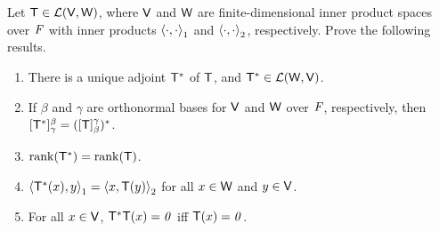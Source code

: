 \begin{ex}\label{ex:6.3.15}
  Let \(\mathsf{T} \in \mathcal{L}(\mathsf{V}, \mathsf{W})\), where \(\mathsf{V}\) and \(\mathsf{W}\) are finite-dimensional inner product spaces over \(\mathit{F}\) with inner products \(\left\langle\cdot, \cdot\right\rangle_1\) and \(\left\langle\cdot, \cdot\right\rangle_2\), respectively.
  Prove the following results.
  \begin{enumerate}
    \item There is a unique adjoint \(\mathsf{T}^*\) of \(\mathsf{T}\), and \(\mathsf{T}^* \in \mathcal{L}(\mathsf{W}, \mathsf{V})\).
    \item If \(\beta\) and \(\gamma\) are orthonormal bases for \(\mathsf{V}\) and \(\mathsf{W}\) over \(\mathit{F}\), respectively, then \([\mathsf{T}^*]_{\gamma}^{\beta} = ([\mathsf{T}]_{\beta}^{\gamma})^*\).
    \item \(\rk{\T^*} = \rk{\T}\).
    \item \(\left\langle\mathsf{T}^*(x), y\right\rangle_1 = \left\langle x, \mathsf{T}(y)\right\rangle_2\) for all \(x \in \mathsf{W}\) and \(y \in \mathsf{V}\).
    \item For all \(x \in \mathsf{V}\), \(\mathsf{T}^* \mathsf{T}(x) = \mathit{0}\) iff \(\mathsf{T}(x) = \mathit{0}\).
  \end{enumerate}
\end{ex}

